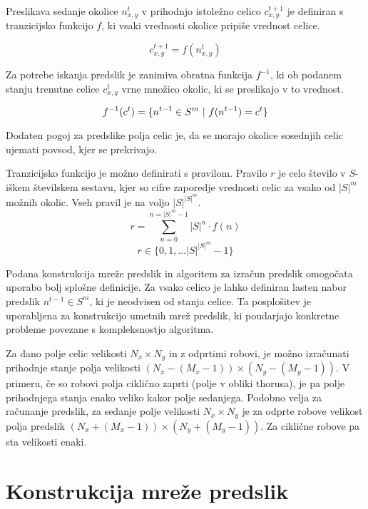 \documentclass[12pt,a4paper,openany,twoside]{book}
\begin{document}
Preslikava sedanje okolice \(n_{x,y}^{t}\) v prihodnjo istoležno celico \(c_{x,y}^{t+1}\) je definiran
s tranzicijsko funkcijo \(f\), ki vsaki vrednosti okolice pripiše vrednost celice.

\begin{equation}
c_{x,y}^{t+1} = f(n_{x,y}^{t})
\end{equation}

Za potrebe iskanja predslik je zanimiva obratna funkcija \(f^{-1}\), ki ob
podanem stanju trenutne celice \(c_{x,y}^{t}\) vrne množico okolic,
ki se preslikajo v to vrednost.

\begin{equation}
f^{-1}(c^{t}) = \{ n^{t-1} \in S^m \ \arrowvert \ f(n^{t-1}) = c^{t} \}
\end{equation}

Dodaten pogoj za predslike polja celic je, da se morajo okolice sosednjih celic
ujemati povsod, kjer se prekrivajo.

Tranzicijsko funkcijo je možno definirati s pravilom.
Pravilo \(r\) je celo število v \(S\)-iškem številskem sestavu,
kjer so cifre zaporedje vrednosti celic za vsako od \(|S|^m\) možnih okolic.
Vseh pravil je na voljo \(|S|^{|S|^m}\).
\begin{equation}
r = \sum_{n=0}^{n=|S|^m-1} |S|^n \cdot f(n)
\end{equation}
\begin{equation}
r \in \{0, 1, \dots |S|^{|S|^m}-1\}
\end{equation}

Podana konstrukcija mreže predslik in algoritem za izračun predslik omogočata uporabo
bolj splošne definicije. Za vsako celico je lahko definiran lasten nabor predslik \( n^{t-1} \in S^m \),
ki je neodvisen od stanja celice. Ta posplošitev je uporabljena za konstrukcijo umetnih
mrež predslik, ki poudarjajo konkretne probleme povezane s kompleksnostjo algoritma.

Za dano polje celic velikosti \(N_x \times N_y\) in z odprtimi robovi,
je možno izračunati prihodnje stanje polja velikosti \((N_x-(M_x-1)) \times (N_y-(M_y-1))\).
V primeru, če so robovi polja ciklično zaprti (polje v obliki thorusa),
je pa polje prihodnjega stanja enako veliko kakor polje sedanjega.
Podobno velja za računanje predslik, za sedanje polje velikosti \(N_x \times N_y\)
je za odprte robove velikost polja predslik \((N_x+(M_x-1)) \times (N_y+(M_y-1))\).
Za ciklične robove pa sta velikosti enaki.

\chapter{Konstrukcija mreže predslik}
\end{document}
